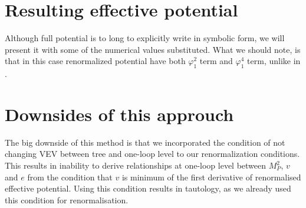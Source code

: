 \section{Resulting effective potential}\label{finitemomentumissue}
Although full potential is to long to explicitly write in symbolic form, we 
will present it with some of the numerical values substituted. 
What we should note, is that in this case renormalized potential have both $\varphi_1^2$ term 
and $\varphi_1^4$ term, unlike in \cite{Coleman1973}. \\
\section{Downsides of this approuch}
The big downside of this method is that we incorporated the condition of not changing VEV between 
tree and one-loop level to our renormalization conditions. This results in inability to 
derive relationships at one-loop level between $M_P^2$, $v$ and $e$ from the condition that 
$v$ is minimum of the first derivative of renormalised effective potential. Using this 
condition results in tautology, as we already used this condition for renormalisation. 
